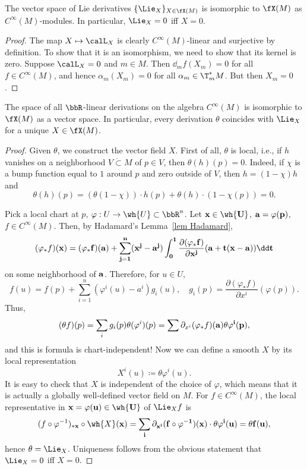 \begin{prop}\label{prop 2.2.9 Marsden}
    The vector space of Lie derivatives $\{\Lie_X\}_{X\in\fX(M)}$ is isomorphic to $\fX(M)$ as $C^\infty(M)$-modules. In particular, $\Lie_X=0$ iff $X=0$.
\end{prop}
\begin{proof}
    The map $X\mapsto \calL_X$ is clearly $C^\infty(M)$-linear and surjective by definition. To show that it is an isomorphism, we need to show that its kernel is zero. Suppose $\calL_X=0$ and $m\in M$. Then $\dd_m f(X_m)=0$ for all $f\in C^\infty(M)$, and hence $\alpha_m(X_m)=0$ for all $\alpha_m\in \T_m^\ast M$. But then $X_m=0$.
\end{proof}
\begin{prop}\label{lie derivatives and vector fields}
The space of all $\bbR $-linear derivations on the algebra $C^\infty(M)$ is isomorphic to $\fX(M)$ as a vector space. In particular, every derivation $\theta$ coincides with $\Lie_X$ for a unique $X\in\fX(M)$.
\end{prop}
\begin{proof}
    Given $\theta$, we construct the vector field $X$.
    First of all, $\theta$ is local, i.e., if $h$ vanishes on a neighborhood $V\mathring{\subset} M$ of $p\in V$, then $\theta(h)(p)=0$. Indeed, if $\chi$ is a bump function equal to $1$ around $p$ and zero outside of $V$, then $h=(1-\chi)h$ and
    \[\theta(h)(p)=(\theta(1-\chi))\cdot h(p)+\theta(h)\cdot (1-\chi(p))=0.\]

    Pick a local chart at $p$, $\varphi:U\to\wh{U}\subset\bbR^n$. Let $\bf{x}\in\wh{U}$, $\bf{a}=\varphi(p)$, $f\in C^\infty(M)$. Then, by Hadamard's Lemma~\ref{lem Hadamard}, 
    \[(\varphi_\ast f)(\bf{x})=(\varphi_\ast f)(\bf{a})+\sum_{j=1}^n (x^j-a^j)\int_0^1 \frac{\partial(\varphi_\ast f)}{\partial x^j} (\bf{a}+t(\bf{x}-\bf{a}))\dd t\]
    on some neighborhood of $\bf{a}$.
    Therefore, for $u\in U$,
    \[f(u)=f(p)+\sum_{i=1}^n (\varphi^i(u)-a^i)g_i(u),\quad g_i(p)=\frac{\partial(\varphi_\ast f)}{\partial x^i} (\varphi(p)).\] 
    Thus,
    \[(\theta f)(p)=\sum_i g_i(p)\theta(\varphi^i)(p)=\sum \partial_{x^i}(\varphi_\ast f)(\bf{a}) \theta \varphi^i(p),\]
    and this is formula is chart-independent! Now we can define a smooth $X$ by its local representation
    \[X^i(u)\coloneqq \theta\varphi^i(u).\]
    It is easy to check that $X$ is independent of the choice of $\varphi$, which means that it is actually a globally well-defined vector field on $M$. For $f\in C^\infty(M)$, the local representative in $\bf{x}=\varphi(u)\in\wh{U}$ of $\Lie_X f$ is 
    \[(f\circ\varphi^{-1})_{\ast \bf{x}}\circ \wh{X}(\bf{x})=\sum_i \partial_{x^i}(f\circ \varphi^{-1})(x)\cdot \theta \varphi^i (u)=\theta f(u),\]
    hence $\theta=\Lie_X$.
    Uniqueness follows from the obvious statement that $\Lie_X=0$ iff $X=0$.
\end{proof}
